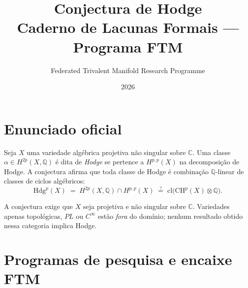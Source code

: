 \documentclass[11pt,a4paper]{article}
\title{Conjectura de Hodge\\[4pt]
       \large Caderno de Lacunas Formais — Programa FTM}
\author{Federated Trivalent Manifold Research Programme}
\date{2026}
\begin{document}
\maketitle
\tableofcontents
\bigskip

\section{Enunciado oficial}

\begin{definition}
Seja $X$ uma variedade algébrica projetiva não singular sobre $\mathbb C$.
Uma classe $\alpha\in H^{2p}(X,\mathbb Q)$ é dita de \emph{Hodge}
se pertence a $H^{p,p}(X)$ na decomposição de Hodge.
A conjectura afirma que toda classe de Hodge é combinação
$\mathbb Q$-linear de classes de ciclos algébricos:
\[
  \mathrm{Hdg}^p(X)
  \;=\; H^{2p}(X,\mathbb Q)\cap H^{p,p}(X)
  \;\stackrel{?}{=}\; \mathrm{cl}\bigl(\mathrm{CH}^p(X)\otimes\mathbb Q\bigr).
\]
\end{definition}

\begin{remark}
A conjectura exige que $X$ seja projetiva e não singular sobre $\mathbb C$.
Variedades apenas topológicas, $PL$ ou $C^\infty$ estão \emph{fora}
do domínio; nenhum resultado obtido nessa categoria implica Hodge.
\end{remark}

\bigskip

\section{Programas de pesquisa e encaixe FTM}
\end{document}
